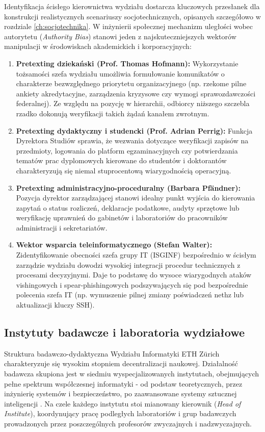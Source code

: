 Identyfikacja ścisłego kierownictwa wydziału dostarcza kluczowych przesłanek dla konstrukcji realistycznych scenariuszy socjotechnicznych, opisanych szczegółowo w rozdziale \ref{ch:socjotechnika}. W inżynierii społecznej mechanizm uległości wobec autorytetu (\textit{Authority Bias}) stanowi jeden z najskuteczniejszych wektorów manipulacji w środowiskach akademickich i korporacyjnych:
\begin{enumerate}
    \item \textbf{Pretexting dziekański (Prof. Thomas Hofmann):} Wykorzystanie tożsamości szefa wydziału umożliwia formułowanie komunikatów o charakterze bezwzględnego priorytetu organizacyjnego (np. rzekome pilne ankiety akredytacyjne, zarządzenia kryzysowe czy wymogi sprawozdawczości federalnej). Ze względu na pozycję w hierarchii, odbiorcy niższego szczebla rzadko dokonują weryfikacji takich żądań kanałem zwrotnym.
    \item \textbf{Pretexting dydaktyczny i studencki (Prof. Adrian Perrig):} Funkcja Dyrektora Studiów sprawia, że wezwania dotyczące weryfikacji zapisów na przedmioty, logowania do platform egzaminacyjnych czy potwierdzania tematów prac dyplomowych kierowane do studentów i doktorantów charakteryzują się niemal stuprocentową wiarygodnością operacyjną.
    \item \textbf{Pretexting administracyjno-proceduralny (Barbara Pfändner):} Pozycja dyrektor zarządzającej stanowi idealny punkt wyjścia do kierowania zapytań o status rozliczeń, deklaracje podatkowe, audyty sprzętowe lub weryfikację uprawnień do gabinetów i laboratoriów do pracowników administracji i sekretariatów.
    \item \textbf{Wektor wsparcia teleinformatycznego (Stefan Walter):} Zidentyfikowanie obecności szefa grupy IT (ISGINF) bezpośrednio w ścisłym zarządzie wydziału dowodzi wysokiej integracji procedur technicznych z procesami decyzyjnymi. Daje to podstawę do wysoce wiarygodnych ataków vishingowych i spear-phishingowych podszywających się pod bezpośrednie polecenia szefa IT (np. wymuszenie pilnej zmiany poświadczeń nethz lub aktualizacji kluczy SSH).
\end{enumerate}

\subsection{Instytuty badawcze i laboratoria wydziałowe}\label{subsec:instytuty-laboratoria}

Struktura badawczo-dydaktyczna Wydziału Informatyki ETH Zürich charakteryzuje się wysokim stopniem decentralizacji naukowej. Działalność badawcza skupiona jest w siedmiu wyspecjalizowanych instytutach, obejmujących pełne spektrum współczesnej informatyki - od podstaw teoretycznych, przez inżynierię systemów i bezpieczeństwo, po zaawansowane systemy sztucznej inteligencji \cite{eth_dinfk_institutes}. Na czele każdego instytutu stoi mianowany kierownik (\textit{Head of Institute}), koordynujący pracę podległych laboratoriów i grup badawczych prowadzonych przez poszczególnych profesorów zwyczajnych i nadzwyczajnych.

